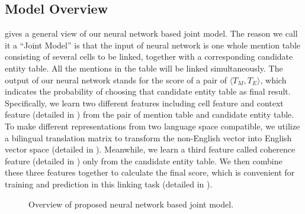 \subsection{Model Overview}


 gives a general view of our neural network based joint model. The reason we call it a ``Joint Model'' is that the input of neural network is one whole mention table consisting of several cells to be linked, together with a corresponding candidate entity table. All the mentions in the table will be linked simultaneously. The output of our neural network stands for the score of a pair of $\langle T_M, T_E\rangle $, which indicates the probability of choosing that candidate entity table as final result. Specifically, we learn two different features including cell feature and context feature (detailed in ) from the pair of mention table and candidate entity table. To make different representations from two language space compatible, we utilize a bilingual translation matrix to transform the non-English vector into English vector space (detailed in ). Meanwhile, we learn a third feature called coherence feature (detailed in ) only from the candidate entity table. We then combine these three features together to calculate the final score, which is convenient for training and prediction in this linking task (detailed in ). 

\begin{figure}
	\centering
	\caption{Overview of proposed neural network based joint model.}
	\label{fig:overview}
\end{figure}
